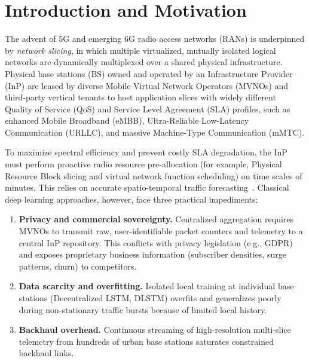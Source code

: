 \documentclass[11pt,a4paper]{article}
\begin{document}
\section{Introduction and Motivation}
The advent of 5G and emerging 6G radio access networks (RANs) is underpinned by \textit{network slicing}, in which multiple virtualized, mutually isolated logical networks are dynamically multiplexed over a shared physical infrastructure. Physical base stations (BS) owned and operated by an Infrastructure Provider (InP) are leased by diverse Mobile Virtual Network Operators (MVNOs) and third-party vertical tenants to host application slices with widely different Quality of Service (QoS) and Service Level Agreement (SLA) profiles, such as enhanced Mobile Broadband (eMBB), Ultra-Reliable Low-Latency Communication (URLLC), and massive Machine-Type Communication (mMTC).

To maximize spectral efficiency and prevent costly SLA degradation, the InP must perform proactive radio resource pre-allocation (for example, Physical Resource Block slicing and virtual network function scheduling) on time scales of minutes. This relies on accurate spatio-temporal traffic forecasting~\cite{bega2019deepcog}. Classical deep learning approaches, however, face three practical impediments:
\begin{enumerate}
    \item \textbf{Privacy and commercial sovereignty.} Centralized aggregation requires MVNOs to transmit raw, user-identifiable packet counters and telemetry to a central InP repository. This conflicts with privacy legislation (e.g., GDPR) and exposes proprietary business information (subscriber densities, surge patterns, churn) to competitors.
    \item \textbf{Data scarcity and overfitting.} Isolated local training at individual base stations (Decentralized LSTM, DLSTM) overfits and generalizes poorly during non-stationary traffic bursts because of limited local history.
    \item \textbf{Backhaul overhead.} Continuous streaming of high-resolution multi-slice telemetry from hundreds of urban base stations saturates constrained backhaul links.
\end{enumerate}
\end{document}
